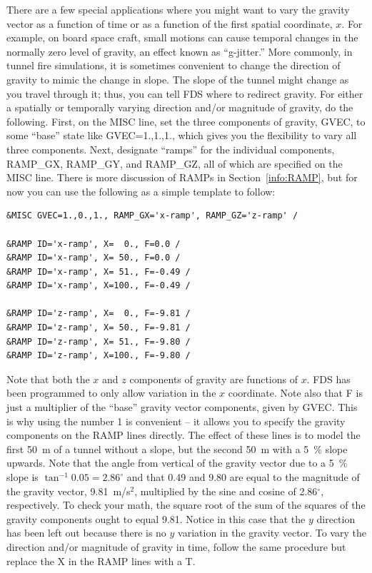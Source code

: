\documentclass[11pt]{book}
\begin{document}
There are a few special applications where you might want to vary the gravity vector as a function of time or as a function of the first spatial coordinate, $x$. For example, on board space craft, small motions can cause temporal changes in the normally zero level of gravity, an effect known as ``g-jitter.'' More commonly, in tunnel fire simulations, it is sometimes convenient to change the direction of gravity to mimic the change in slope. The slope of the tunnel might change as you travel through it; thus, you can tell FDS where to redirect gravity. For either a spatially or temporally varying direction and/or magnitude of gravity, do the following. First, on the {\ct MISC} line, set the three components of gravity, {\ct GVEC}, to some ``base'' state like {\ct GVEC=1.,1.,1.}, which gives you the flexibility to vary all three components. Next, designate ``ramps'' for the individual components, {\ct RAMP\_GX}, {\ct RAMP\_GY}, and {\ct RAMP\_GZ}, all of which are specified on the {\ct MISC} line. There is more discussion of {\ct RAMP}s in Section~\ref{info:RAMP}, but for now you can use the following as a simple template to follow:
\begin{lstlisting}
&MISC GVEC=1.,0.,1., RAMP_GX='x-ramp', RAMP_GZ='z-ramp' /

&RAMP ID='x-ramp', X=  0., F=0.0 /
&RAMP ID='x-ramp', X= 50., F=0.0 /
&RAMP ID='x-ramp', X= 51., F=-0.49 /
&RAMP ID='x-ramp', X=100., F=-0.49 /

&RAMP ID='z-ramp', X=  0., F=-9.81 /
&RAMP ID='z-ramp', X= 50., F=-9.81 /
&RAMP ID='z-ramp', X= 51., F=-9.80 /
&RAMP ID='z-ramp', X=100., F=-9.80 /
\end{lstlisting}
Note that both the $x$ and $z$ components of gravity are functions of $x$. FDS has been programmed to only allow variation in the $x$ coordinate. Note also that {\ct F} is just a multiplier of the ``base'' gravity vector components, given by {\ct GVEC}. This is why using the number 1 is convenient -- it allows you to specify the gravity components on the {\ct RAMP} lines directly. The effect of these lines is to model the first 50~m of a tunnel without a slope, but the second 50~m with a 5~\% slope upwards. Note that the angle from vertical of the gravity vector due to a 5~\% slope is $\tan^{-1} 0.05=2.86^\circ$ and that 0.49 and 9.80 are equal to the magnitude of the gravity vector, 9.81~m/s$^2$, multiplied by the sine and cosine of 2.86$^\circ$, respectively. To check your math, the square root of the sum of the squares of the gravity components ought to equal 9.81. Notice in this case that the $y$ direction has been left out because there is no $y$ variation in the gravity vector.
To vary the direction and/or magnitude of gravity in time, follow the same procedure but replace the {\ct X} in the {\ct RAMP}
lines with a {\ct T}.
\end{document}
